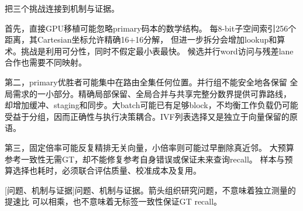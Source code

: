 把三个挑战连接到机制与证据。

首先，直接GPU移植可能忽略primary码本的数学结构。
每8-bit子空间索引256个距离，其Cartesian坐标允许精确16+16分解，
但进一步拆分会增加lookup和算术。挑战是利用可分性，同时不假定最小表最快。
候选并行word访问与残差lane合作也需要不同映射。

第二，primary优胜者可能集中在路由全集任何位置。并行组不能安全地各保留
全局需求的一小部分。精确局部保留、全局合并与共享完整分数界提供可靠路线，
却增加缓冲、staging和同步。大batch可能已有足够block，不均衡工作负载仍可能
受益于分组，因而正确性与执行决策耦合。IVF列表选择又是独立于向量保留的原语。

第三，固定倍率可能反复精排无关向量，小倍率则可能过早删除真近邻。
大预算参考一致性无需GT，却不能修复参考自身错误或保证未来查询recall。
样本与预算选择也耗时，必须联合评估质量、校准成本及复用。

\par\medskip\noindent\begin{minipage}{\linewidth}
\centering\captionsetup{hypcap=false}
\resizebox{\linewidth}{!}{}
[问题、机制与证据]{问题、机制与证据。箭头组织研究问题，不意味着独立测量的提速比
可以相乘，也不意味着无标签一致性保证GT recall。}
\label{fig:1-challenges}
\end{minipage}\par\medskip
